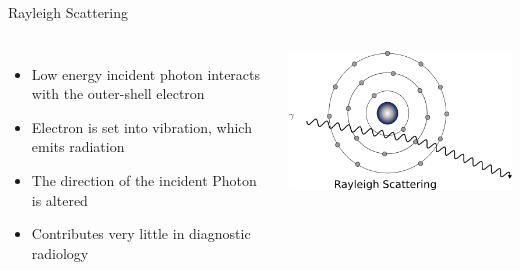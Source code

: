 \begin{frame}[c]{Rayleigh Scattering}
    \begin{columns}[c]
        \begin{itemize}
            \setlength\itemsep{0.2cm}
            \item Low energy incident photon interacts with the outer-shell electron
            \item Electron is set into vibration, which emits radiation
            \item The direction of the incident Photon is altered
            \item Contributes very little in diagnostic radiology
        \end{itemize}
        \includegraphics[height=0.5\textheight]{images/rayleigh}\\[-0.5\baselineskip]
    \end{columns}
\end{frame}




